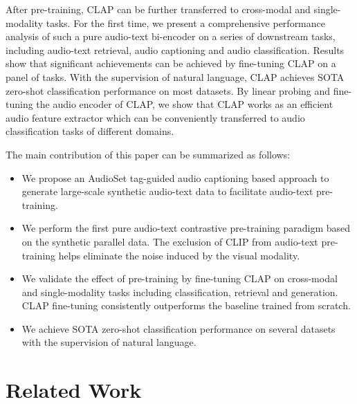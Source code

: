 \documentclass[sigconf,anonymous,review]{acmart}
\begin{document}
After pre-training, CLAP can be further transferred to cross-modal and single-modality tasks.
For the first time, we present a comprehensive performance analysis of such a pure audio-text bi-encoder on a series of downstream tasks, including audio-text retrieval, audio captioning and audio classification.
Results show that significant achievements can be achieved by fine-tuning CLAP on a panel of tasks.
With the supervision of natural language, CLAP achieves SOTA zero-shot classification performance on most datasets.
By linear probing and fine-tuning the audio encoder of CLAP, we show that CLAP works as an efficient audio feature extractor which can be conveniently transferred to audio classification tasks of different domains.

The main contribution of this paper can be summarized as follows:
\begin{itemize}
    \item We propose an AudioSet tag-guided audio captioning based approach to generate large-scale synthetic audio-text data to facilitate audio-text pre-training.
    \item We perform the first pure audio-text contrastive pre-training paradigm based on the synthetic parallel data. The exclusion of CLIP from audio-text pre-training helps eliminate the noise induced by the visual modality.
    \item We validate the effect of pre-training by fine-tuning CLAP on cross-modal and single-modality tasks including classification, retrieval and generation. CLAP fine-tuning consistently outperforms the baseline trained from scratch.
    \item We achieve SOTA zero-shot classification performance on several datasets with the supervision of natural language.  
\end{itemize}


\section{Related Work}
\end{document}

